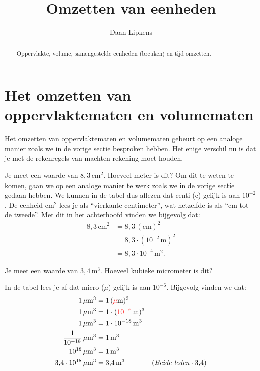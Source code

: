 \documentclass{ximera}
\title{Omzetten van eenheden}
\author{Daan Lipkens}
\begin{document}
\begin{abstract}
    Oppervlakte, volume, samengestelde eenheden (breuken) en tijd omzetten.
\end{abstract}
\maketitle

\section{Het omzetten van oppervlaktematen en volumematen}
Het omzetten van oppervlaktematen en volumematen gebeurt op een analoge manier zoals we in de vorige sectie besproken hebben. Het enige verschil nu is dat je met de rekenregels van machten rekening moet houden.

\begin{example}[title={Invullen van Prefix}]\nl
    Je meet een waarde van $8{,}3 \, \mathrm{cm}^{2}$. Hoeveel meter is dit? Om dit te weten te komen, gaan we op een analoge manier te werk zoals we in de vorige sectie gedaan hebben. We kunnen in de tabel dus aflezen dat centi (c) gelijk is aan $10^{-2}$. De eenheid $\mathrm{cm}^{2}$ lees je als ``vierkante centimeter'', wat hetzelfde is als ``cm tot de tweede''. Met dit in het achterhoofd vinden we bijgevolg dat:
    \begin{align*}
    8{,}3 \, \mathrm{cm}^{2} & = 8{,}3 \, (\mathrm{cm})^{2} \\
    & = 8{,}3 \cdot (10^{-2} \, \mathrm{m})^{2} \\
    & = 8{,}3 \cdot 10^{-4} \, \mathrm{m}^{2}.
    \end{align*}
\end{example}

\begin{example}[foldable=true,title={Voorbeeld: Kubieke meter omzetten naar kubieke micrometer}]\nl
    Je meet een waarde van $3{,}4 \, \mathrm{m}^{3}$. Hoeveel kubieke micrometer is dit?

    \begin{solution}\nl
    In de tabel lees je af dat micro ($\mu$) gelijk is aan $10^{-6}$. Bijgevolg vinden we dat:
    \begin{align*}
    1 \, \mathrm{\mu m}^{3} & = 1 \, (\textcolor{red}{\mathrm{\mu}}\mathrm{m})^{3} & \\
    1 \, \mathrm{\mu m}^{3} & = 1 \cdot (\textcolor{red}{10^{-6}} \, \mathrm{m})^{3} & \\
    1 \, \mathrm{\mu m}^{3} & = 1 \cdot 10^{-18} \, \mathrm{m}^{3} & \\
    \frac{1}{10^{-18}} \, \mathrm{\mu m}^{3} & = 1 \, \mathrm{m}^{3} & \\
    10^{18} \, \mathrm{\mu m}^{3} & = 1 \, \mathrm{m}^{3} & \\
    3{,}4 \cdot 10^{18} \, \mathrm{\mu m}^{3} & = 3{,}4 \, \mathrm{m}^{3} & (\text{\textit{Beide leden}} \cdot 3{,}4) \\
    \end{align*}
    \end{solution}
\end{example}
\end{document}
